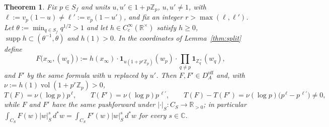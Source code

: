 \documentclass[11pt]{amsart}
\newtheorem{theorem}{Theorem}[section]
\theoremstyle{definition}
\theoremstyle{remark}
\newcommand{\C}{\mathbb C}
\newcommand{\R}{\mathbb R}
\newcommand{\Z}{\mathbb Z}
\newcommand{\dstar}{\,d^{*}}
\newcommand{\supp}{\operatorname{supp}}
\newcommand{\vol}{\operatorname{vol}}
\newcommand{\DA}{D_A}
\begin{document}
\begin{theorem}\label{thm:separate}
Fix $p\in S_f$ and units $u,u'\in1+p\Z_p$, $u,u'\ne1$, with
$\ell:=v_p(1-u)\ne \ell':=v_p(1-u')$, and fix an integer $r>\max(\ell,\ell')$.  Let
$\theta:=\min_{q\in S_f}q^{1/2}>1$ and let $h\in C_c^{\infty}(\R^{\times})$
satisfy $h\ge0$, $\supp h\subset(\theta^{-1},\theta)$ and $h(1)>0$.  In the
coordinates of Lemma~\ref{thm:split} define
\begin{equation}\label{eq:sepsections}
F\bigl(x_{\infty},(w_q)\bigr):=h(x_{\infty})\cdot
\mathbf 1_{u(1+p^{r}\Z_p)}(w_p)\cdot\prod_{q\ne p}\mathbf 1_{\Z_q^{\times}}(w_q),
\end{equation}
and $F'$ by the same formula with $u$ replaced by $u'$.  Then $F,F'\in
\DA^{\mathrm{off}}$ and, with $\nu:=h(1)\vol(1+p^{r}\Z_p)>0$,
\begin{equation}\label{eq:sepvalues}
T(F)=\nu(\log p)p^{\,\ell},\qquad T(F')=\nu(\log p)p^{\,\ell'},\qquad
T(F)-T(F')=\nu(\log p)\bigl(p^{\,\ell}-p^{\,\ell'}\bigr)\neq0,
\end{equation}
while $F$ and $F'$ have the same pushforward under
$|\cdot|_S:C_S\to\R_{>0}$; in particular
$\int_{C_S}F(w)|w|_S^{s}\dstar w=\int_{C_S}F'(w)|w|_S^{s}\dstar w$ for every
$s\in\C$.
\end{theorem}
\end{document}

